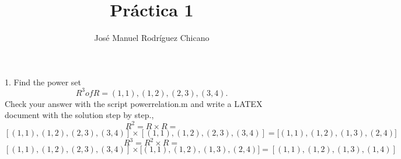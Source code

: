 \documentclass{article}
\title{Práctica 1}
\author{José Manuel Rodríguez Chicano}
\begin{document}

\maketitle



1. Find the power set $$R^3 of R = {(1, 1), (1, 2), (2, 3), (3, 4)}.$$ Check your answer with the script powerrelation.m and write a LATEX document with the
solution step by step.,
$$R^2 = R \times R= $$ $$ {[(1, 1), (1, 2), (2, 3), (3, 4)]}\times {[(1, 1), (1, 2), (2, 3), (3, 4)]} ={[(1,1),(1,2),(1,3),(2,4)}]$$
$$R^3 = R^2\times R = $$ $${[(1, 1), (1, 2), (2, 3), (3, 4)]}\times {[(1,1),(1,2),(1,3),(2,4)}] ={[(1,1),(1,2),(1,3),(1,4)]}$$
\end{document}
